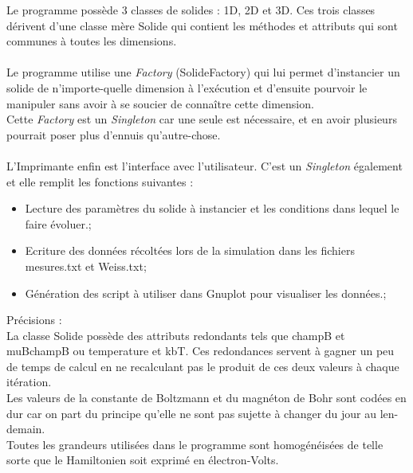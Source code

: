 Le programme possède 3 classes de solides : 1D, 2D et 3D. Ces trois classes dérivent d'une classe mère Solide qui contient les méthodes et attributs qui sont communes à toutes les dimensions.\\
\\
Le programme utilise une \emph{Factory} (SolideFactory) qui lui permet d'instancier un solide de n'importe-quelle dimension à l’exécution et d'ensuite pourvoir le manipuler sans avoir à se soucier de connaître cette dimension.\\
Cette \emph{Factory} est un \emph{Singleton} car une seule est nécessaire, et en avoir plusieurs pourrait poser plus d'ennuis qu'autre-chose.\\
\\
L'Imprimante enfin est l'interface avec l'utilisateur. C'est un \emph{Singleton} également et elle remplit les fonctions suivantes :\\
\begin{itemize}
\item Lecture des paramètres du solide à instancier et les conditions dans lequel le faire évoluer.;
\item Ecriture des données récoltées lors de la simulation dans les fichiers mesures.txt et Weiss.txt;
\item Génération des script à utiliser dans Gnuplot pour visualiser les données.;
\end{itemize}
\vspace{\parskip} %

Précisions :\\
La classe Solide possède des attributs redondants tels que champB et muBchampB ou temperature et kbT. Ces redondances servent à gagner un peu de temps de calcul en ne recalculant pas le produit de ces deux valeurs à chaque itération.\\
Les valeurs de la constante de Boltzmann et du magnéton de Bohr sont codées en dur car on part du principe qu'elle ne sont pas sujette à changer du jour au len-demain.\\
Toutes les grandeurs utilisées dans le programme sont homogénéisées de telle sorte que le Hamiltonien soit exprimé en électron-Volts.

